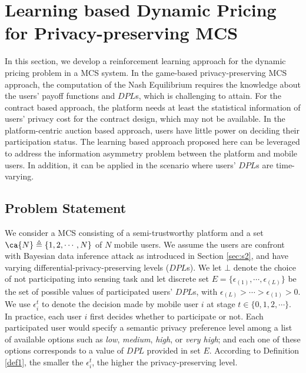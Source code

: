 \section{Learning based Dynamic Pricing for Privacy-preserving MCS}\label{sec:s4}
In this section, we develop a reinforcement learning approach for the dynamic pricing problem in a MCS system. In the game-based privacy-preserving MCS approach, the computation of the Nash Equilibrium requires the knowledge about the users' payoff functions and $DPL$s, which is challenging to attain. For the contract based approach, the platform needs at least the statistical information of users' privacy cost for the contract design, which may not be available. In the platform-centric auction based approach, users have little power on deciding their participation status. The learning based approach proposed here can be leveraged to address the information asymmetry problem between the platform and mobile users. In addition, it can be applied in the scenario where users' $DPL$s are time-varying.

\subsection{Problem Statement}
We consider a MCS consisting of a semi-trustworthy platform and a set $\ca{N}\triangleq\{1,2,\cdots,N\}$ of $N$ mobile users. We assume the users are confront with Bayesian data inference attack as introduced in Section \ref{sec:s2}, and have varying differential-privacy-preserving levels ($DPL$s). We let $\bot$ denote the choice of not participating into sensing task and let discrete set $E=\{\epsilon_{(1)},\cdots,\epsilon_{(L)}\}$ be the set of possible values of participated users' $DPL$s, with $\epsilon_{(L)}>\cdots>\epsilon_{(1)}>0$. We use $\epsilon_i^t$ to denote the decision made by mobile user $i$ at stage $t\in \{0,1,2,\cdots\}$. In practice, each user $i$ first decides whether to participate or not. Each participated user would specify a semantic privacy preference level among a list of available options such as \emph{low}, \emph{medium}, \emph{high}, or \emph{very high}; and each one of these options corresponds to a value of $DPL$ provided in set $E$. According to Definition \ref{def1}, the smaller the $\epsilon_i^t$, the higher the privacy-preserving level. 

